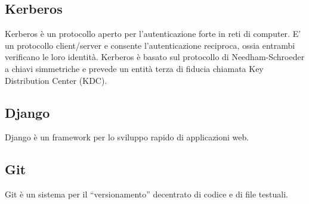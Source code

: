 \subsection{Kerberos}
Kerberos è un protocollo aperto per l'autenticazione forte in reti di
computer. E' un protocollo client/server e consente l'autenticazione
reciproca, ossia entrambi verificano le loro identità. Kerberos è
basato sul protocollo di Needham-Schroeder a chiavi simmetriche e
prevede un entità terza di fiducia chiamata Key Distribution Center
(KDC).

\subsection{Django}
Django è un framework per lo sviluppo rapido di applicazioni web.

\subsection{Git}\label{sec:GIT}
Git è un sistema per il ``versionamento'' decentrato di codice e di file
testuali. 

